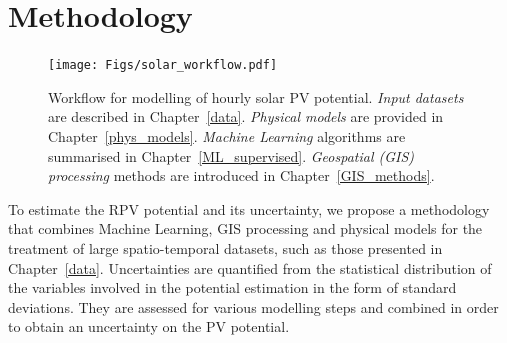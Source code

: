 \section{Methodology}
\label{solar_method}

\begin{figure}[tb]
\centering\texttt{[image: Figs/solar\_workflow.pdf]}
\caption{Workflow for modelling of hourly solar PV potential. \textit{Input datasets }are described in Chapter~\ref{data}. \textit{Physical models} are provided in Chapter~\ref{phys_models}. \textit{Machine Learning} algorithms are summarised in Chapter~\ref{ML_supervised}. \textit{Geospatial (GIS) processing} methods are introduced in Chapter~\ref{GIS_methods}.}
\label{fig:workflow_PV}
\end{figure}

To estimate the RPV potential and its uncertainty, we propose a methodology that combines Machine Learning, GIS processing and physical models for the treatment of large spatio-temporal datasets, such as those presented in Chapter~\ref{data}.
Uncertainties are quantified from the statistical distribution of the variables involved in the potential estimation in the form of standard deviations.
They are assessed for various modelling steps and combined in order to obtain an uncertainty on the PV potential.

